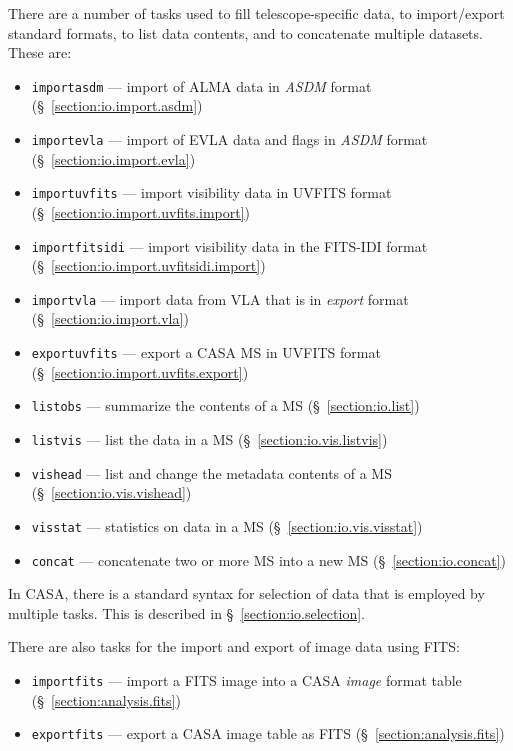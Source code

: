 There are a number of tasks used to fill telescope-specific data,
to import/export standard formats, to list data contents, and
to concatenate multiple datasets.  These are:
\begin{itemize}
   \item {\tt importasdm} --- import of ALMA data in 
         {\it ASDM} format (\S~\ref{section:io.import.asdm})
   \item {\tt importevla} --- import of EVLA data and flags in 
         {\it ASDM} format (\S~\ref{section:io.import.evla})
   \item {\tt importuvfits} --- import visibility data in UVFITS
         format (\S~\ref{section:io.import.uvfits.import})
   \item {\tt importfitsidi} --- import visibility data in the
     FITS-IDI format (\S~\ref{section:io.import.uvfitsidi.import})
   \item {\tt importvla} --- import data from VLA that is in 
         {\it export} format (\S~\ref{section:io.import.vla})
   \item {\tt exportuvfits} --- export a CASA MS in UVFITS format 
         (\S~\ref{section:io.import.uvfits.export})
   \item {\tt listobs} --- summarize the contents of a MS 
         (\S~\ref{section:io.list})
   \item {\tt listvis} --- list the data in a MS 
         (\S~\ref{section:io.vis.listvis})
   \item {\tt vishead} --- list and change the metadata contents of a MS 
         (\S~\ref{section:io.vis.vishead})
   \item {\tt visstat} --- statistics on data in a MS 
         (\S~\ref{section:io.vis.visstat})
   \item {\tt concat} --- concatenate two or more MS into a
         new MS (\S~\ref{section:io.concat})
\end{itemize}

In CASA, there is a standard syntax for selection of data that
is employed by multiple tasks.  
This is described in \S~\ref{section:io.selection}.

There are also tasks for the import and export of image data using
FITS:
\begin{itemize}
   \item {\tt importfits} --- import a FITS image into a CASA  
         {\it image} format table 
         (\S~\ref{section:analysis.fits})
   \item {\tt exportfits} --- export a CASA image table as FITS 
         (\S~\ref{section:analysis.fits})
\end{itemize}

